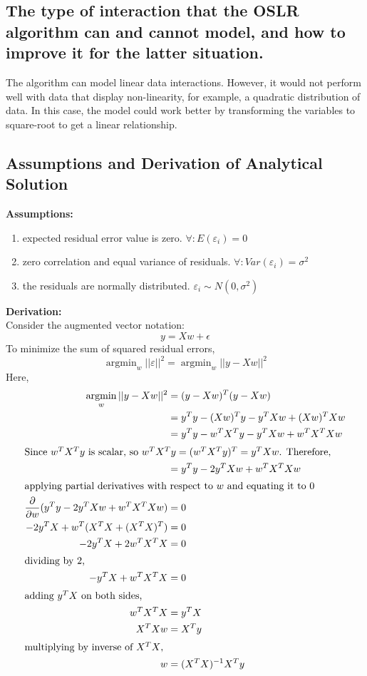 \subsection{The type of interaction that the OSLR algorithm can and cannot model, and how to improve it for the latter situation.}
    The algorithm can model linear data interactions. However, it would not perform well with data that display non-linearity, for example, a quadratic distribution of data. In this case, the model could work better by transforming the variables to square-root to get a linear relationship.
    
    \subsection{Assumptions and Derivation of Analytical Solution}
    \textbf{Assumptions:}
    \begin{enumerate}
    \item expected residual error value is zero. $\forall : E(\varepsilon_i) = 0$
    \item zero correlation and equal variance of residuals. $\forall : Var(\varepsilon_i) = \sigma^2$
   \item the residuals are normally distributed. $\varepsilon_i \sim N(0,\sigma^2)$
   \end{enumerate}
   \textbf {Derivation:}\\
    Consider the augmented vector notation:
    \begin{equation*}
        y = Xw + \epsilon
    \end{equation*}
    To minimize the sum of squared residual errors,
    \newcommand{\argmin}{\mathop{\mathrm{argmin}}}
    \begin{equation*}
        \argmin_w ||\varepsilon||^2 = \argmin_w ||y - Xw||^2
    \end{equation*}
    Here,
    \begin{align*}
        \argmin_w ||y - Xw||^2 &= (y-Xw)^T (y-Xw)\\
        &= y^Ty - (Xw)^Ty - y^TXw + (Xw)^TXw\\
        &= y^Ty - w^TX^Ty - y^TXw + w^TX^TXw\\
        \intertext{Since $w^TX^Ty$ is scalar, so $w^TX^Ty = (w^TX^Ty)^T = y^TXw$. Therefore,} 
        &= y^Ty - 2y^TXw + w^TX^TXw\\
        \intertext{applying partial derivatives with respect to $w$ and equating it to 0}
        \frac{\partial}{\partial w} (y^Ty - 2y^TXw + w^TX^TXw)   &= 0\\
        - 2y^TX + w^T(X^TX + (X^TX)^T) &= 0\\
        - 2y^TX + 2w^TX^TX &= 0\\
         \intertext{dividing by 2,}
        - y^TX + w^TX^TX &= 0\\
        \intertext{adding $y^TX$ on both sides,}
        w^TX^TX &= y^TX\\
        X^TXw &= X^Ty\\
        \intertext{multiplying by inverse of $X^TX$,}
        w &= (X^TX)^{-1}X^Ty
    \end{align*}
